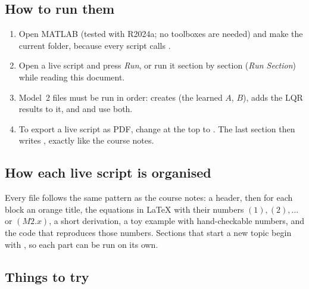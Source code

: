 \subsection{How to run them}

\begin{enumerate}
  \item Open MATLAB (tested with R2024a; no toolboxes are needed) and make  the current folder, because
        every script calls .
  \item Open a live script and press \emph{Run}, or run it section by section (\emph{Run Section}) while reading this document.
  \item Model~2 files must be run in order:  creates  (the learned $A$, $B$),
         adds the LQR results to it, and  and  use both.
  \item To export a live script as PDF, change  at the top to . The last
        section then writes , exactly like the course notes.
\end{enumerate}

\subsection{How each live script is organised}

Every file follows the same pattern as the course notes: a header, then for each block an orange title, the equations in
LaTeX with their numbers $(1),(2),\dots$ or $(M2.x)$, a short derivation, a toy example with hand-checkable numbers, and the
code that reproduces those numbers. Sections that start a new topic begin with , so
each part can be run on its own.

\subsection{Things to try}

